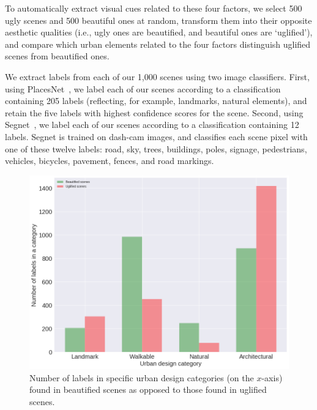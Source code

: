 To automatically extract visual cues related to these four factors, we select 500 ugly scenes and 500 beautiful ones at random, transform them into their opposite aesthetic qualities (i.e., ugly ones are beautified, and beautiful ones are `uglified'), and compare which urban elements related to the four factors distinguish uglified scenes from beautified ones. 

We extract labels from each of our 1,000 scenes using two image classifiers. First, using PlacesNet~\cite{zhou2014learning}, we label each of our scenes according to a classification containing 205 labels (reflecting, for example, landmarks, natural elements), and retain the five labels with highest confidence scores for the scene. Second, using Segnet~\cite{badrinarayanan2015segnet}, we  label each of our scenes according to a classification containing 12 labels. Segnet is trained on dash-cam images, and classifies each scene pixel with one of these twelve labels: road, sky, trees,  buildings, poles, signage, pedestrians, vehicles, bicycles, pavement, fences, and road markings. 

\begin{figure}[h]
    \centering
    \includegraphics[width=\columnwidth]{taxonomyCount.png}
    \caption{Number of labels in specific urban design categories (on the $x$-axis) found in beautified scenes as opposed to those found in uglified scenes.}
    \label{fig:taxonomyCount}
\end{figure}


